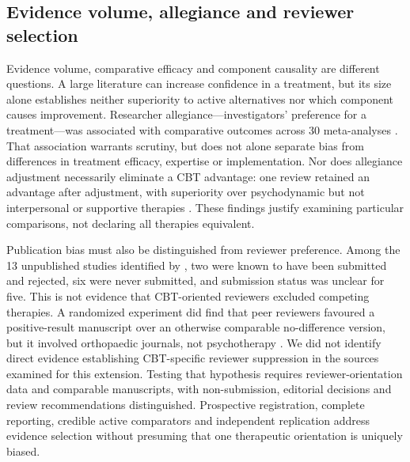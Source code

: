 \subsection{Evidence volume, allegiance and reviewer selection}\label{sec:selection}
Evidence volume, comparative efficacy and component causality are different questions.
A large literature can increase confidence in a treatment, but its size alone establishes neither superiority to active alternatives nor which component causes improvement.
Researcher allegiance---investigators' preference for a treatment---was associated with comparative outcomes across 30 meta-analyses \citep{munder2013allegiance}.
That association warrants scrutiny, but does not alone separate bias from differences in treatment efficacy, expertise or implementation.
Nor does allegiance adjustment necessarily eliminate a CBT advantage: one review retained an advantage after adjustment, with superiority over psychodynamic but not interpersonal or supportive therapies \citep{tolin2010cbt}.
These findings justify examining particular comparisons, not declaring all therapies equivalent.

Publication bias must also be distinguished from reviewer preference.
Among the 13 unpublished studies identified by \citet{driessen2015publicationbias}, two were known to have been submitted and rejected, six were never submitted, and submission status was unclear for five.
This is not evidence that CBT-oriented reviewers excluded competing therapies.
A randomized experiment did find that peer reviewers favoured a positive-result manuscript over an otherwise comparable no-difference version, but it involved orthopaedic journals, not psychotherapy \citep{emerson2010peerreview}.
We did not identify direct evidence establishing CBT-specific reviewer suppression in the sources examined for this extension.
Testing that hypothesis requires reviewer-orientation data and comparable manuscripts, with non-submission, editorial decisions and review recommendations distinguished.
Prospective registration, complete reporting, credible active comparators and independent replication address evidence selection without presuming that one therapeutic orientation is uniquely biased.

